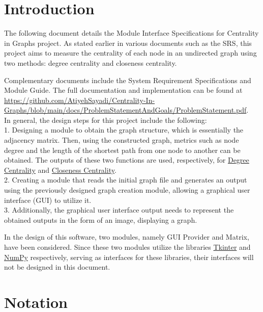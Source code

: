 \documentclass[12pt, titlepage]{article}
\begin{document}
\section{Introduction}

The following document details the Module Interface Specifications for Centrality in Graphs project. As stated earlier in various documents such as the SRS, this project aims to measure the centrality of each node in an undirected graph using two methods: degree centrality and closeness centrality.

Complementary documents include the System Requirement Specifications
and Module Guide.  The full documentation and implementation can be
found at \url{https://github.com/AtiyehSayadi/Centrality-In-Graphs/blob/main/docs/ProblemStatementAndGoals/ProblemStatement.pdf}. \\
In general, the design steps for this project include the following:\\
1. Designing a module to obtain the graph structure, which is essentially the adjacency matrix. Then, using the constructed graph, metrics such as node degree and the length of the shortest path from one node to another can be obtained. The outputs of these two functions are used, respectively, for \href{https://towardsdatascience.com/graph-analytics-introduction-and-concepts-of-centrality-8f5543b55de3}{Degree Centrality} and \href{https://www.geeksforgeeks.org/closeness-centrality-centrality-measure/}{Closeness Centrality}.\\
2. Creating a module that reads the initial graph file and generates an output using the previously designed graph creation module, allowing a graphical user interface (GUI) to utilize it.\\
3. Additionally, the graphical user interface output needs to represent the obtained outputs in the form of an image, displaying a graph.

In the design of this software, two modules, namely GUI Provider and Matrix, have been considered. Since these two modules utilize the libraries \href{https://docs.python.org/3/library/tk.html}{Tkinter} and \href{https://numpy.org/}{NumPy} respectively, serving as interfaces for these libraries, their interfaces will not be designed in this document.

\section{Notation}
\end{document}
